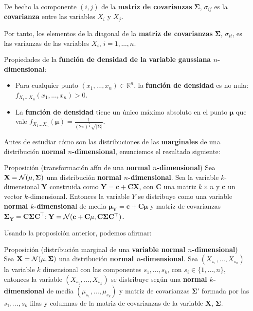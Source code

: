 \documentclass[
  letterpaper,
  DIV=11,
  numbers=noendperiod]{scrreprt}
\begin{document}
De hecho la componente \((i,j)\) de la \textbf{matriz de covarianzas}
\(\mathbf{\Sigma}\), \(\sigma_{ij}\) es la \textbf{covarianza} entre las
variables \(X_i\) y \(X_j\).

Por tanto, los elementos de la diagonal de la \textbf{matriz de
covarianzas} \(\mathbf{\Sigma}\), \(\sigma_{ii}\), es las varianzas de
las variables \(X_i\), \(i=1,\ldots,n\).

Propiedades de la \textbf{función de densidad de la variable gaussiana
\(n\)-dimensional}:

\begin{itemize}
\item
  Para cualquier punto \((x_1,\ldots,x_n)\in\mathbb{R}^n\), la
  \textbf{función de densidad} es no nula:
  \(f_{X_1\ldots X_n}(x_1,\ldots,x_n)>0\).
\item
  La \textbf{función de densidad} tiene un único máximo absoluto en el
  punto \(\mathbf{\mu}\) que vale
  \(f_{X_1\ldots X_n}(\mathbf{\mu})=\frac{1}{(2\pi)^{\frac{n}{2}}\sqrt{\mathbf{|\Sigma|}}}\).
\end{itemize}

Antes de estudiar cómo son las distribuciones de las \textbf{marginales}
de una distribución \textbf{normal \(n\)-dimensional}, enunciemos el
resultado siguiente:

Proposición (transformación afín de una \textbf{normal
\(n\)-dimensional}) Sea
\(\mathbf{X}={\cal N}(\mathbf{\mu},\mathbf{\Sigma})\) una distribución
\textbf{normal \(n\)-dimensional}. Sea la variable \(k\)-dimensional
\(\mathbf{Y}\) construida como
\(\mathbf{Y}=\mathbf{c}+\mathbf{C}\mathbf{X}\), con \(\mathbf{C}\) una
matriz \(k\times n\) y \(\mathbf{c}\) un vector \(k\)-dimensional.
Entonces la variable \(Y\) se distribuye como una variable
\textbf{normal \(k\)-dimensional} de media
\(\mathbf{\mu}_{\mathbf{Y}}=\mathbf{c}+\mathbf{C}\mathbf{\mu}\) y matriz
de covarianzas
\(\mathbf{\Sigma}_{\mathbf{Y}}=\mathbf{C}\mathbf{\Sigma}\mathbf{C}^\top\):
\(\mathbf{Y}={\cal N}(\mathbf{c}+\mathbf{C}\mathbf{\mu},\mathbf{C}\mathbf{\Sigma}\mathbf{C}^\top)\).

Usando la proposición anterior, podemos afirmar:

Proposición (distribución marginal de una \textbf{variable normal
\(n\)-dimensional}) Sea
\(\mathbf{X}={\cal N}(\mathbf{\mu},\mathbf{\Sigma})\) una distribución
\textbf{normal \(n\)-dimensional}. Sea \((X_{s_1},\ldots,X_{s_k})\) la
variable \(k\) dimensional con las componentes \(s_1,\ldots,s_k\), con
\(s_i\in\{1,\ldots,n\}\), entonces la variable
\((X_{s_1},\ldots,X_{s_k})\) se distribuye según una \textbf{normal
\(k\)-dimensional} de media \((\mu_{s_1},\ldots,\mu_{s_k})\) y matriz de
covarianzas \(\mathbf{\Sigma'}\) formada por las \(s_1,\ldots,s_k\)
filas y columnas de la matriz de covarianzas de la variable
\(\mathbf{X}\), \(\mathbf{\Sigma}\).
\end{document}
